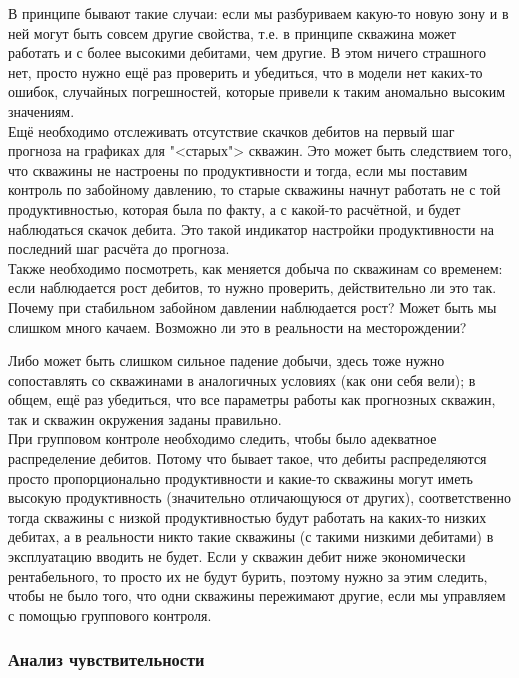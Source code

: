 \documentclass[main.tex]{subfiles}
\begin{document}
В принципе бывают такие случаи: если мы разбуриваем какую-то новую зону и в ней могут быть совсем другие свойства, т.е. в принципе скважина может работать и с более высокими дебитами, чем другие.
В этом ничего страшного нет, просто нужно ещё раз проверить и убедиться, что в модели нет каких-то ошибок, случайных погрешностей, которые привели к таким аномально высоким значениям.
\\

Ещё необходимо отслеживать отсутствие скачков дебитов на первый шаг прогноза на графиках для "<старых"> скважин.
Это может быть следствием того, что скважины не настроены по продуктивности и тогда, если мы поставим контроль по забойному давлению, то старые скважины начнут работать не с той продуктивностью, которая была по факту, а с какой-то расчётной, и будет наблюдаться скачок дебита.
Это такой индикатор настройки продуктивности на последний шаг расчёта до прогноза.
\\

Также необходимо посмотреть, как меняется добыча по скважинам со временем: если наблюдается рост дебитов, то нужно проверить, действительно ли это так.
Почему при стабильном забойном давлении наблюдается рост? Может быть мы слишком много качаем. Возможно ли это в реальности на месторождении?

Либо может быть слишком сильное падение добычи, здесь тоже нужно сопоставлять со скважинами в аналогичных условиях (как они себя вели); в общем, ещё раз убедиться, что все параметры работы как прогнозных скважин, так и скважин окружения заданы правильно.
\\

При групповом контроле необходимо следить, чтобы было адекватное распределение дебитов.
Потому что бывает такое, что дебиты распределяются просто пропорционально продуктивности и какие-то скважины могут иметь высокую продуктивность (значительно отличающуюся от других), соответственно тогда скважины с низкой продуктивностью будут работать на каких-то низких дебитах, а в реальности никто такие скважины (с такими низкими дебитами) в эксплуатацию вводить не будет.
Если у скважин дебит ниже экономически рентабельного, то просто их не будут бурить, поэтому нужно за этим следить, чтобы не было того, что одни скважины пережимают другие, если мы управляем с помощью группового контроля.

\subsubsection{Анализ чувствительности}
\end{document}
